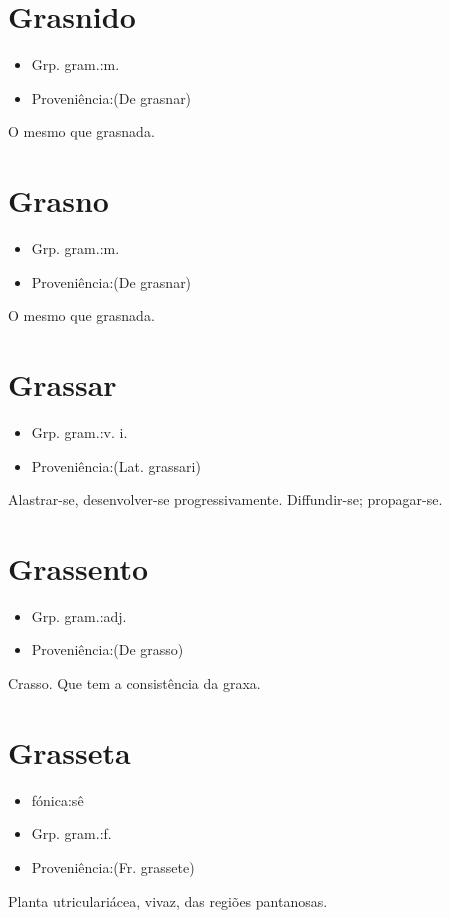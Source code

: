 \section{Grasnido}
\begin{itemize}
\item {Grp. gram.:m.}
\end{itemize}
\begin{itemize}
\item {Proveniência:(De \textunderscore grasnar\textunderscore )}
\end{itemize}
O mesmo que \textunderscore grasnada\textunderscore .
\section{Grasno}
\begin{itemize}
\item {Grp. gram.:m.}
\end{itemize}
\begin{itemize}
\item {Proveniência:(De \textunderscore grasnar\textunderscore )}
\end{itemize}
O mesmo que \textunderscore grasnada\textunderscore .
\section{Grassar}
\begin{itemize}
\item {Grp. gram.:v. i.}
\end{itemize}
\begin{itemize}
\item {Proveniência:(Lat. \textunderscore grassari\textunderscore )}
\end{itemize}
Alastrar-se, desenvolver-se progressivamente.
Diffundir-se; propagar-se.
\section{Grassento}
\begin{itemize}
\item {Grp. gram.:adj.}
\end{itemize}
\begin{itemize}
\item {Proveniência:(De \textunderscore grasso\textunderscore )}
\end{itemize}
Crasso.
Que tem a consistência da graxa.
\section{Grasseta}
\begin{itemize}
\item {fónica:sê}
\end{itemize}
\begin{itemize}
\item {Grp. gram.:f.}
\end{itemize}
\begin{itemize}
\item {Proveniência:(Fr. \textunderscore grassete\textunderscore )}
\end{itemize}
Planta utriculariácea, vivaz, das regiões pantanosas.
